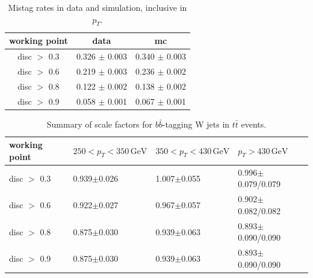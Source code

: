 \begin{table}[hbp!]
\centering
\caption{Mistag rates in data and simulation, inclusive in $p_{T}$.}
\label{tab:mistag}
\begin{tabular}{c|cc}
\hline\hline
working point & data & mc\\
\hline
disc $>$ 0.3 & 0.326 $\pm$ 0.003 & 0.340 $\pm$ 0.003 \\
disc $>$ 0.6 & 0.219 $\pm$ 0.003 & 0.236 $\pm$ 0.002 \\
disc $>$ 0.8 & 0.122 $\pm$ 0.002 & 0.138 $\pm$ 0.002 \\
disc $>$ 0.9 & 0.058 $\pm$ 0.001 & 0.067 $\pm$ 0.001 \\
\hline\hline
\end{tabular}
\end{table}

\begin{table}[hbp!]
\centering
\caption{Summary of scale factors for $b\bar{b}$-tagging W jets in $t\bar{t}$ events.}
\label{tab:sf}
\begin{tabular}{l|lll}
\hline\hline
working point & $250 < p_{T} < 350\,\textrm{GeV}$ & $350 < p_{T} < 430\,\textrm{GeV}$ & $p_{T}>430\,\textrm{GeV}$\\
\hline
disc $>$ 0.3 & 0.939$\pm$0.026 & 1.007$\pm$0.055 & 0.996$\pm$0.079/0.079 \\
disc $>$ 0.6 & 0.922$\pm$0.027 & 0.967$\pm$0.057 & 0.902$\pm$0.082/0.082  \\
disc $>$ 0.8 & 0.875$\pm$0.030 & 0.939$\pm$0.063 & 0.893$\pm$0.090/0.090  \\
disc $>$ 0.9 & 0.875$\pm$0.030 & 0.939$\pm$0.063 & 0.893$\pm$0.090/0.090  \\
\hline\hline
\end{tabular}
\end{table}
